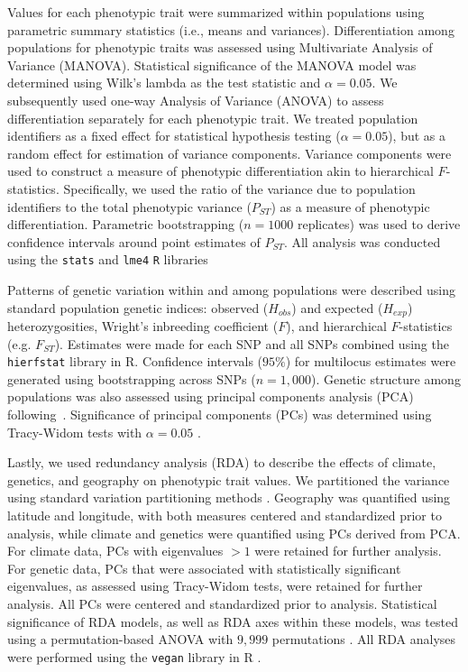 \documentclass[smallextended]{svjour3}
\begin{document}
Values for each phenotypic trait were summarized  within populations using
parametric summary statistics (i.e., means and variances). Differentiation
among
populations for phenotypic traits was assessed using Multivariate Analysis of
Variance (MANOVA). Statistical significance of the MANOVA model was determined
using Wilk's lambda as the test statistic and $\alpha = 0.05$. We subsequently
used one-way Analysis of Variance (ANOVA) to assess differentiation separately
for each phenotypic trait. We treated population identifiers as a fixed effect
for statistical hypothesis testing ($\alpha = 0.05$), but as a random effect
for
estimation of variance components. Variance components were used to construct a
measure of phenotypic differentiation akin to hierarchical $F$-statistics.
Specifically, we used the ratio of the variance due to population identifiers
to
the total phenotypic variance ($P_{ST}$) as a measure of phenotypic
differentiation. Parametric bootstrapping ($n = 1000$ replicates) was used
to derive confidence intervals around point estimates of $P_{ST}$. All analysis
was conducted using the \texttt{stats} and
\texttt{lme4} \texttt{R} libraries \citep[][version 3.1.2]{R:2015}

Patterns of genetic variation within and among populations were described using
standard population genetic indices: observed ($H_{obs}$) and expected
($H_{exp}$) heterozygosities, Wright's inbreeding coefficient ($F$), and
hierarchical $F$-statistics (e.g. $F_{ST}$). Estimates were made for each SNP
and all SNPs combined using the \texttt{hierfstat} library in R. Confidence
intervals ($95\%$) for multilocus estimates were generated using bootstrapping
across SNPs ($n = 1,000$). Genetic structure among populations was also
assessed
using principal components analysis (PCA) following~\cite{Patterson:2006}.
Significance of principal components (PCs) was determined using Tracy-Widom
tests with $\alpha = 0.05$ \citep{Patterson:2006}.

Lastly, we used redundancy analysis (RDA) to describe the effects of climate,
genetics, and geography on phenotypic trait values. We partitioned the variance
using standard variation partitioning methods \citep{Borcard:1992, Liu:1997}.
Geography was quantified using latitude and longitude, with both measures
centered and standardized prior to analysis, while climate and genetics were
quantified using PCs derived from PCA. For climate data, PCs with eigenvalues
$> 1$ were retained for further analysis. For genetic data, PCs that were
associated with statistically significant eigenvalues, as assessed using
Tracy-Widom tests, were retained for further analysis. All PCs were
centered and standardized prior to analysis. Statistical significance
of RDA models, as well as RDA axes within these models, was tested using
a permutation-based ANOVA with $9,999$ permutations \citep{Legendre:2011}. All
RDA analyses were performed using the \texttt{vegan} library in R
\citep{R:vegan}.
\end{document}
